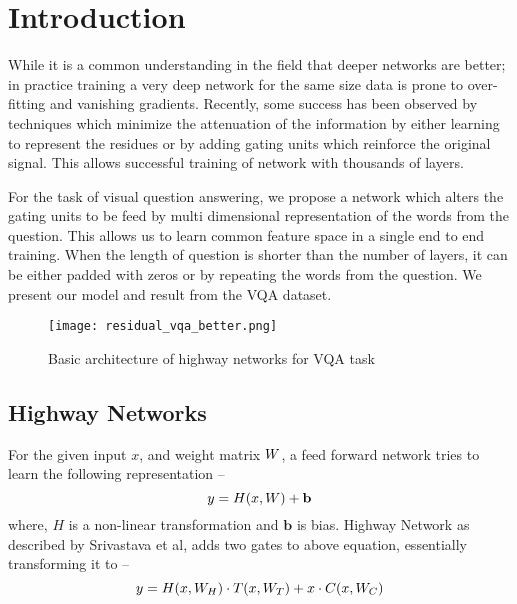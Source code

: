 
\section{Introduction}

While it is a common understanding in the field that deeper networks are better\cite{ba2014deep}; in practice training a very deep network for the same size data is prone to over-fitting and vanishing gradients. Recently, some success has been observed by techniques which minimize the attenuation of the information by either learning to represent the residues\cite{he2015deep} or by adding gating units which reinforce the original signal\cite{srivastava2015highway}. This allows successful training of network with thousands of layers.

For the task of visual question answering, we propose a network which alters the gating units to be feed by multi dimensional representation of the words from the question. This allows us to learn common feature space in a single end to end training. When the length of question is shorter than the number of layers, it can be either padded with zeros or by repeating the words from the question. We present our model and result from the VQA dataset\cite{antol2015vqa}. 

\begin{figure}[H]
\centering
\texttt{[image: residual\_vqa\_better.png]}
\caption{Basic architecture of highway networks for VQA task}
\label{fig:long}
\label{fig:onecol}
\end{figure}
\subsection{Highway Networks}

For the given input $x$, and weight matrix $\boldmath{W}$, a feed forward network tries to learn the following representation --
\begin{displaymath}
y = H(x, \boldmath{W}) + \mathbf{b}
\end{displaymath}
where, $H$ is a non-linear transformation and $\mathbf{b}$ is bias. Highway Network as described by Srivastava et al\cite{srivastava2015highway}, adds two gates to above equation, essentially transforming it to --
\begin{displaymath}
y = H(x, \boldmath{W_H})\cdot T(x, \boldmath{W_T}) + x \cdot C(x,\boldmath{W_C})
\end{displaymath}



